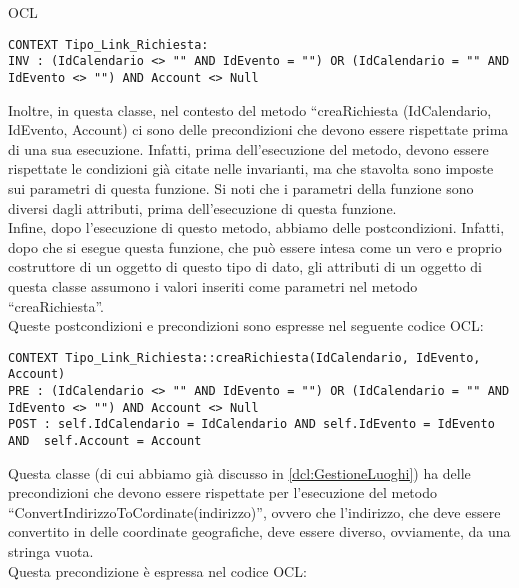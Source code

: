 \begin{listaPersonale}{OCL}
    \begin{lstlisting}
CONTEXT Tipo_Link_Richiesta:
INV : (IdCalendario <> "" AND IdEvento = "") OR (IdCalendario = "" AND IdEvento <> "") AND Account <> Null
    \end{lstlisting}
    Inoltre, in questa classe, nel contesto del metodo “creaRichiesta (IdCalendario, IdEvento, Account) ci sono delle precondizioni che devono essere rispettate prima di una sua esecuzione. Infatti, prima dell'esecuzione del metodo, devono essere rispettate le condizioni già citate nelle invarianti, ma che stavolta sono imposte sui parametri di questa funzione. Si noti che i parametri della funzione sono diversi dagli attributi, prima dell'esecuzione di questa funzione.\\
    Infine, dopo l'esecuzione di questo metodo, abbiamo delle postcondizioni. Infatti, dopo che si esegue questa funzione, che può essere intesa come un vero e proprio costruttore di un oggetto di questo tipo di dato, gli attributi di un oggetto di questa classe assumono i valori inseriti come parametri nel metodo “creaRichiesta”. \\
    Queste postcondizioni e precondizioni sono espresse nel seguente codice OCL:

    \begin{lstlisting}
CONTEXT Tipo_Link_Richiesta::creaRichiesta(IdCalendario, IdEvento, Account)
PRE : (IdCalendario <> "" AND IdEvento = "") OR (IdCalendario = "" AND IdEvento <> "") AND Account <> Null
POST : self.IdCalendario = IdCalendario AND self.IdEvento = IdEvento AND  self.Account = Account  
    \end{lstlisting}




    \begin{center}
        
    \end{center}
    Questa classe (di cui abbiamo già discusso in \ref{dcl:GestioneLuoghi}) ha delle precondizioni che devono essere rispettate per l'esecuzione del metodo “ConvertIndirizzoToCordinate(indirizzo)”, ovvero che l'indirizzo, che deve essere convertito in delle coordinate geografiche, deve essere diverso, ovviamente, da una stringa vuota.\\
    Questa precondizione è espressa nel codice OCL:


\end{listaPersonale}
